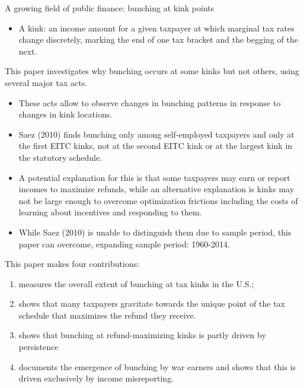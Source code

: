 \documentclass[../root]{subfiles}
\begin{document}
    A growing field of public finance: bunching at kink points
    \begin{itemize}
        \item A kink: an income amount for a given taxpayer at which marginal tax rates change discretely, marking the end of one tax bracket and the begging of the next.
    \end{itemize}
    This paper investigates why bunching occurs at some kinks but not others,
    using several major tax acts.
    \begin{itemize}
        \item These acts allow to observe changes in bunching patterns in response to changes in kink locations.
        \item Saez (2010) finds bunching only among self-employed taxpayers and only at the first EITC kinks, not at the second EITC kink or at the largest kink in the statutory schedule.
        \item A potential explanation for this is that some taxpayers may earn or report incomes to maximize refunds, while an alternative explanation is kinks may not be large enough to overcome optimization frictions including the costs of learning about incentives and responding to them.
        \item While Saez (2010) is unable to distinguish them due to sample period, this paper can overcome, expanding sample period: 1960-2014.
    \end{itemize}
    This paper makes four contributions:
    \begin{enumerate}
        \item measures the overall extent of bunching at tax kinks in the U.S.;
        \item shows that many taxpayers gravitate towards the unique point of the tax schedule that maximizes the refund they receive.
        \item shows that bunching at refund-maximizing kinks is partly driven by persistence
        \item documents the emergence of bunching by war earners and shows that this is driven exclusively by income misreporting. 
    \end{enumerate}
\end{document}
